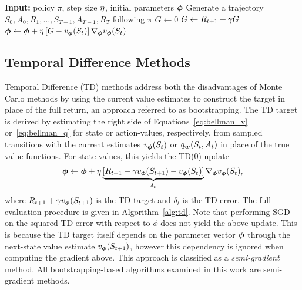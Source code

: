   \begin{algorithm}[t]
  \caption{Monte Carlo Policy Evaluation}
  \label{alg:mc}
  \begin{algorithmic}[1]
  \State \textbf{Input:} policy $\pi$, step size $\eta$, initial parameters ${\bm \phi}$
      \State Generate a trajectory $S_0, A_0, R_1, \dots, S_{T-1}, A_{T-1}, R_T$ following $\pi$
      \State $G \gets 0$
          \State $G \gets R_{t+1} + \gamma G$
          \State ${\bm \phi} \gets {\bm \phi} + \eta \left[ G - v_{\bm \phi}(S_t) \right] \nabla_{{\bm \phi}} v_{\bm \phi}(S_t)$
      \EndFor
  \EndFor
  \end{algorithmic}
  \end{algorithm}
  
  \subsection{Temporal Difference Methods} \label{subsec:td}
  Temporal Difference (TD) methods address both the disadvantages of Monte Carlo methods by using the current value estimates to construct the target in place of the full return, an approach referred to as bootstrapping. The TD target is derived by estimating the right side of Equations~\eqref{eq:bellman_v} or~\eqref{eq:bellman_q} for state or action-values, respectively, from sampled transitions with the current estimates $v_{\bm \phi}(S_t)$ or $q_{\bm w}(S_t, A_t)$ in place of the true value functions. For state values, this yields the TD(0) update
  \begin{equation}
      {\bm \phi} \gets {\bm \phi} + \eta \underbrace{\left[ R_{t+1} + \gamma v_{\bm \phi}(S_{t+1}) - v_{\bm \phi}(S_t) \right]}_{\delta_t} \nabla_{{\bm \phi}} v_{\bm \phi}(S_t),
      \label{eq:td_update}
  \end{equation}
  where $R_{t+1} + \gamma v_{\bm \phi}(S_{t+1})$ is the TD target and $\delta_t$ is the TD error. The full evaluation procedure is given in Algorithm~\ref{alg:td}. Note that performing SGD on the squared TD error with respect to $\phi$ does not yield the above update. This is because the TD target itself depends on the parameter vector ${\bm \phi}$ through the next-state value estimate $v_{\bm \phi}(S_{t+1})$, however this dependency is ignored when computing the gradient above. This approach is classified as a \textit{semi-gradient} method. All bootstrapping-based algorithms examined in this work are semi-gradient methods.
  

